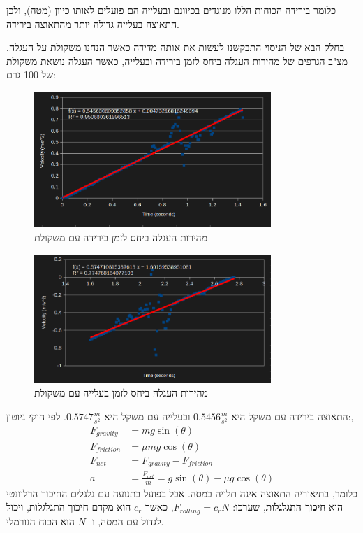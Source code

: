 \documentclass[14pt]{extarticle}
\begin{document}
 כלומר בירידה הכוחות הללו מנוגדים בכיוונם ובעלייה הם פועלים לאותו כיוון (מטה), ולכן התאוצה בעלייה גדולה יותר מהתאוצה בירידה.

 בחלק הבא של הניסוי התבקשנו לעשות את אותה מדידה כאשר הנחנו משקולת על העגלה.
 מצ"ב הגרפים של מהירות העגלה ביחס לזמן בירידה ובעלייה, כאשר העגלה נושאת משקולת של 100 גרם:
\begin{figure}[H]
    \centering
    \includegraphics[width=0.8\textwidth]{maman_13_experiment_2_4_deg_weighted_velocity_to_time_downhill.png}
    \caption{מהירות העגלה ביחס לזמן בירידה עם משקולת}
\end{figure}        

\begin{figure}[H]
    \centering
    \includegraphics[width=0.8\textwidth]{maman_13_experiment_2_4_deg_weighted_velocity_to_time_uphill.png}
    \caption{מהירות העגלה ביחס לזמן בעלייה עם משקולת}
\end{figure}

התאוצה בירידה עם משקל היא $0.5456 \frac{m}{s^2}$ ובעלייה עם משקל היא $0.5747 \frac{m}{s^2}$.
לפי חוקי ניוטון:,
\begin{equation}
\begin{aligned}
F_{gravity} &= m g \sin(\theta) \\
F_{friction} &= \mu m g \cos(\theta) \\
F_{net} &= F_{gravity} - F_{friction} \\
a &= \frac{F_{net}}{m} = g \sin(\theta) - \mu g \cos(\theta)
\end{aligned}
\end{equation}
כלומר, בתיאוריה התאוצה אינה תלויה במסה. אבל בפועל בתנועה עם גלגלים החיכוך הרלוונטי הוא
\textbf{חיכוך התגלגלות},
שערכו: $F_{rolling} = c_r N$,
כאשר
$c_r$
הוא מקדם חיכוך התגלגלות, ויכול לגדול עם המסה, ו-
$N$
הוא הכוח הנורמלי.
\end{document}
